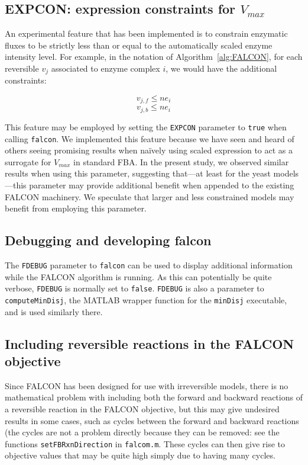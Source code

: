 \subsection{EXPCON: expression constraints for $V_{max}$}
An experimental feature that has been implemented is to constrain
enzymatic fluxes to be strictly less than or equal to the
automatically scaled enzyme intensity level. For example, in the
notation of Algorithm~\ref{alg:FALCON}, for each reversible $v_j$
associated to enzyme complex $i$, we would have the additional
constraints:

\[ v_{j,f} \leq n e_i \]
\[ v_{j,b} \leq n e_i \]

This feature may be employed by setting the \texttt{EXPCON} parameter
to \texttt{true} when calling \texttt{falcon}. We implemented this
feature because we have seen and heard of others seeing promising
results when na\"ively using scaled expression to act as a surrogate for
$V_{max}$ in standard FBA. In the present study, we observed similar
results when using this parameter, suggesting that---at least for the
yeast models---this parameter may provide additional benefit when
appended to the existing FALCON machinery. We speculate that larger
and less constrained models may benefit from employing this parameter.

\subsection{Debugging and developing falcon}
The \texttt{FDEBUG} parameter to \texttt{falcon} can be used to
display additional information while the FALCON algorithm is
running. As this can potentially be quite verbose, \texttt{FDEBUG} is
normally set to \texttt{false}. \texttt{FDEBUG} is also a parameter to
\texttt{computeMinDisj}, the MATLAB wrapper function for the
\texttt{minDisj} executable, and is used similarly there.


\subsection{Including reversible reactions in the FALCON objective}
Since FALCON has been designed for use with irreversible models, there
is no mathematical problem with including both the forward and
backward reactions of a reversible reaction in the FALCON objective,
but this may give undesired results in some cases, such as cycles
between the forward and backward reactions (the cycles are not a
problem directly because they can be removed: see the functions
\texttt{setFBRxnDirection} in \texttt{falcom.m}.  These cycles can
then give rise to objective values that may be quite high simply due
to having many cycles.
